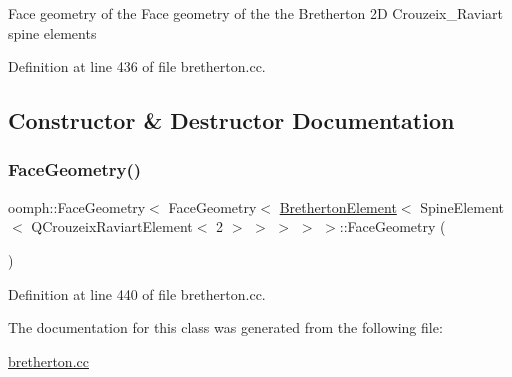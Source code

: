 Face geometry of the Face geometry of the the Bretherton 2D Crouzeix\+\_\+\+Raviart spine elements 

Definition at line 436 of file bretherton.\+cc.



\subsection{Constructor \& Destructor Documentation}
\mbox{\label{classoomph_1_1FaceGeometry_3_01FaceGeometry_3_01BrethertonElement_3_01SpineElement_3_01QCrouzeix098df2efac952001ec21ccc10b121ae7_a52eb404b07af95adc77be5b560f7186b}} 
\subsubsection{\texorpdfstring{Face\+Geometry()}{FaceGeometry()}}
{\footnotesize\ttfamily oomph\+::\+Face\+Geometry$<$ Face\+Geometry$<$ \hyperlink{classBrethertonElement}{Bretherton\+Element}$<$ Spine\+Element$<$ Q\+Crouzeix\+Raviart\+Element$<$ 2 $>$ $>$ $>$ $>$ $>$\+::Face\+Geometry (\begin{DoxyParamCaption}{ }\end{DoxyParamCaption})\hspace{0.3cm}{\ttfamily [inline]}}



Definition at line 440 of file bretherton.\+cc.



The documentation for this class was generated from the following file\+:\begin{DoxyCompactItemize}
\item 
\hyperlink{bretherton_8cc}{bretherton.\+cc}\end{DoxyCompactItemize}

